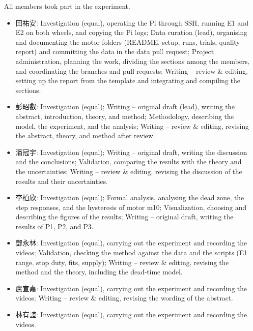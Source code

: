 All members took part in the experiment.
\begin{itemize}
  \item 田祐安: Investigation (equal), operating the Pi through SSH, running E1 and E2 on both wheels, and copying the Pi logs;
    Data curation (lead), organising and documenting the motor folders (README, setup, runs, trials, quality report) and committing the data in the data pull request;
    Project administration, planning the work, dividing the sections among the members, and coordinating the branches and pull requests;
    Writing -- review \& editing, setting up the report from the template and integrating and compiling the sections.
  \item 彭昭叡: Investigation (equal);
    Writing -- original draft (lead), writing the abstract, introduction, theory, and method;
    Methodology, describing the model, the experiment, and the analysis;
    Writing -- review \& editing, revising the abstract, theory, and method after review.
      \item 潘冠宇: Investigation (equal);
    Writing -- original draft, writing the discussion and the conclusions;
    Validation, comparing the results with the theory and the uncertainties;
    Writing -- review \& editing, revising the discussion of the results and their uncertainties.
  \item 李柏欣: Investigation (equal);
    Formal analysis, analysing the dead zone, the step responses, and the hysteresis of motor m10;
    Visualization, choosing and describing the figures of the results;
    Writing -- original draft, writing the results of P1, P2, and P3.
     \item 鄧永林: Investigation (equal), carrying out the experiment and recording the videos;
    Validation, checking the method against the data and the scripts (E1 range, stop duty, fits, supply);
    Writing -- review \& editing, revising the method and the theory, including the dead-time model.
    \item 盧宣嘉: Investigation (equal), carrying out the experiment and recording the videos;
    Writing -- review \& editing, revising the wording of the abstract.
    \item 林有誼: Investigation (equal), carrying out the experiment and recording the videos.
\end{itemize}
